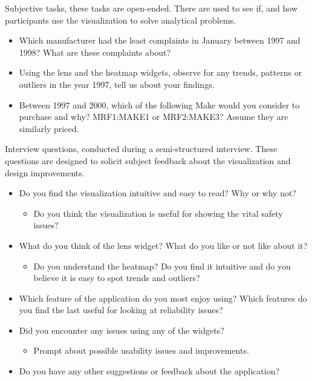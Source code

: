 \noindent 
Subjective tasks, these tasks are open-ended. There are used to see if, and how
participants use the visualization to solve analytical problems.

\begin{itemize}[noitemsep]
  \item Which manufacturer had the least complaints in January between 1997 and
  1998? What are these complaints about?
  \item Using the lens and the heatmap widgets, observe for any trends, patterns
  or outliers in the year 1997, tell us about your findings.
  \item Between 1997 and 2000, which of the following Make would you consider to
  purchase and why? MRF1:MAKE1 or MRF2:MAKE3? Assume they are similarly
  priced.
\end{itemize}

 
\noindent
Interview questions, conducted during a semi-structured interview. These
questions are designed to solicit subject feedback about the visualization and
design improvements.



\begin{itemize}
  \item Do you find the \threed visualization intuitive and easy to read? Why or
  why not?
  \begin{itemize}
    \item Do you think the visualization is useful for showing the vital safety
    issues?
  \end{itemize}
  
  \item What do you think of the lens widget? What do you like or not like about
  it?
  \begin{itemize}
    \item Do you understand the heatmap? Do you find it intuitive and do you
    believe it is easy to spot trends and outliers?
  \end{itemize}
  
  \item Which feature of the application do you most enjoy using? Which features
  do you find the last useful for looking at reliability issues? 
  
  \item Did you encounter any issues using any of the widgets? 
  \begin{itemize}
    \item  Prompt about possible usability issues and improvements.
  \end{itemize}
  
  \item Do you have any other suggestions or feedback about the application?
\end{itemize}